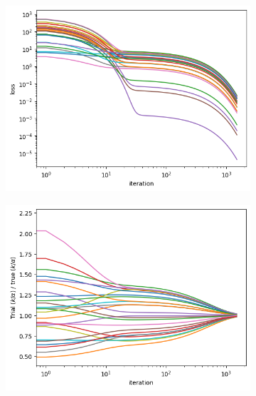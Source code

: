 \documentclass[]{article}
\begin{document}
\begin{appendices}
\begin{figure}[H]
	\caption{Gradient descent performance profile}
	\begin{subfigure}{.5\textwidth}
		\centering
		\includegraphics[scale=0.40]{loss-vs-iteration.png}
		\label{subfig:convergence-loss}
	\end{subfigure}
	\begin{subfigure}{.5\textwidth}
		\centering
		\includegraphics[scale=0.40]{k-a-ratio.png}
		\label{subfig:convergence-ratio}
	\end{subfigure}
	\label{fig:convergence}
\end{figure}


\end{appendices}
\end{document}
